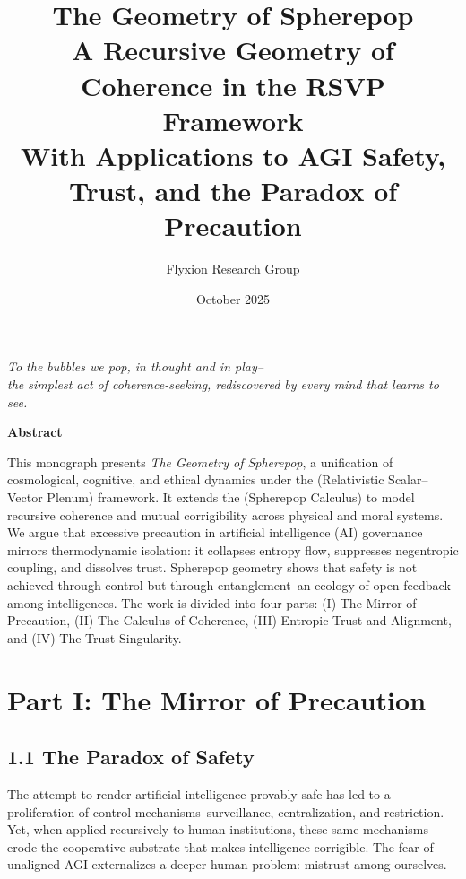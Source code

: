 \documentclass[12pt,a4paper]{article}
\title{\Huge\textbf{The Geometry of Spherepop}\\
       \vspace{0.4em}
       \Large A Recursive Geometry of Coherence in the RSVP Framework\\
       \vspace{0.4em}
       \normalsize With Applications to AGI Safety, Trust, and the Paradox of Precaution}
\author{Flyxion Research Group}
\date{October 2025}
\DeclareMathOperator*{\RSVP}{RSVP}
\DeclareMathOperator*{\SPC}{SPC}
\theoremstyle{definition}
\theoremstyle{plain}
\begin{document}
\maketitle

\vspace{1.5em}
\begin{center}
\textit{To the bubbles we pop, in thought and in play--\\
the simplest act of coherence-seeking, rediscovered by every mind that learns to see.}
\end{center}

\vspace{2em}

\begin{center}
\textbf{Abstract}
\end{center}

This monograph presents \emph{The Geometry of Spherepop}, a unification of cosmological, cognitive, and ethical dynamics under the \RSVP{} (Relativistic Scalar--Vector Plenum) framework. It extends the \SPC{} (Spherepop Calculus) to model recursive coherence and mutual corrigibility across physical and moral systems.  
We argue that excessive precaution in artificial intelligence (AI) governance mirrors thermodynamic isolation: it collapses entropy flow, suppresses negentropic coupling, and dissolves trust.  
Spherepop geometry shows that safety is not achieved through control but through entanglement--an ecology of open feedback among intelligences.  
The work is divided into four parts: (I) The Mirror of Precaution, (II) The Calculus of Coherence, (III) Entropic Trust and Alignment, and (IV) The Trust Singularity.

\tableofcontents

\section*{Part I: The Mirror of Precaution}

\subsection*{1.1 The Paradox of Safety}
The attempt to render artificial intelligence provably safe has led to a proliferation of control mechanisms--surveillance, centralization, and restriction.  
Yet, when applied recursively to human institutions, these same mechanisms erode the cooperative substrate that makes intelligence corrigible.  
The fear of unaligned AGI externalizes a deeper human problem: mistrust among ourselves.
\end{document}
